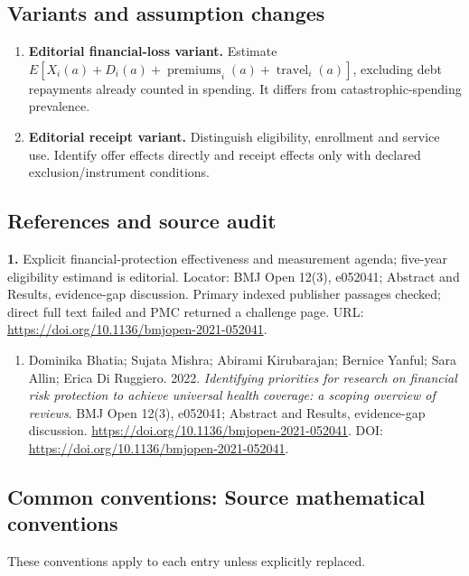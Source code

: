 \documentclass[11pt,a4paper]{article}
\begin{document}
\subsection*{Variants and assumption changes}
\begin{enumerate}
\item \textbf{Editorial financial-loss variant.} Estimate \(E[X_i(a)+D_i(a)+\operatorname{premiums}_i(a)+\operatorname{travel}_i(a)]\), excluding debt repayments already counted in spending. It differs from catastrophic-spending prevalence.
\item \textbf{Editorial receipt variant.} Distinguish eligibility, enrollment and service use. Identify offer effects directly and receipt effects only with declared exclusion/instrument conditions.
\end{enumerate}
\subsection*{References and source audit}
\textbf{1.} Explicit financial-protection effectiveness and measurement agenda; five-year eligibility estimand is editorial. Locator: BMJ Open 12(3), e052041; Abstract and Results, evidence-gap discussion. Primary indexed publisher passages checked; direct full text failed and PMC returned a challenge page. URL: \url{https://doi.org/10.1136/bmjopen-2021-052041}.
\begin{enumerate}\raggedright
\item\hypertarget{definitions:source:30007731:1}{} Dominika Bhatia; Sujata Mishra; Abirami Kirubarajan; Bernice Yanful; Sara Allin; Erica Di Ruggiero. 2022. \emph{Identifying priorities for research on financial risk protection to achieve universal health coverage: a scoping overview of reviews}. BMJ Open 12(3), e052041; Abstract and Results, evidence-gap discussion.
\url{https://doi.org/10.1136/bmjopen-2021-052041}.
DOI: \url{https://doi.org/10.1136/bmjopen-2021-052041}.
\end{enumerate}

\subsection*{Common conventions: Source mathematical conventions}

These conventions apply to each entry unless explicitly replaced.
\end{document}
